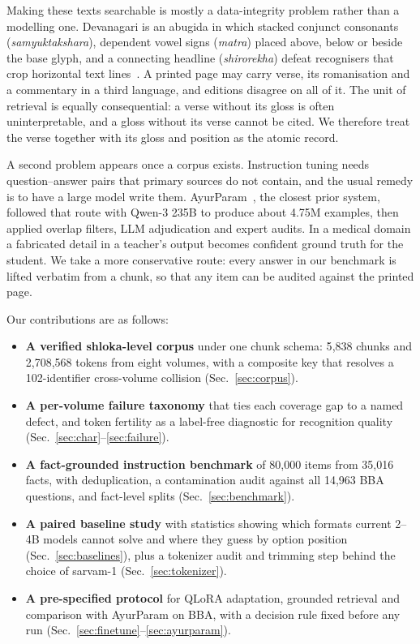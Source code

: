 \documentclass[10pt,twocolumn,letterpaper]{article}
\begin{document}
Making these texts searchable is mostly a data-integrity problem rather than a
modelling one. Devanagari is an abugida in which stacked conjunct consonants
(\emph{samyuktakshara}), dependent vowel signs (\emph{matra}) placed above, below
or beside the base glyph, and a connecting headline (\emph{shirorekha}) defeat
recognisers that crop horizontal text lines~\cite{devaocr,devavlm}. A printed page
may carry verse, its romanisation and a commentary in a third language, and editions
disagree on all of it. The unit of retrieval is equally consequential: a verse
without its gloss is often uninterpretable, and a gloss without its verse cannot
be cited. We therefore treat the verse together with its gloss and position as the
atomic record.

A second problem appears once a corpus exists. Instruction tuning needs
question--answer pairs that primary sources do not contain, and the usual remedy
is to have a large model write them. AyurParam~\cite{ayurparam}, the closest prior
system, followed that route with Qwen-3 235B to produce about 4.75M examples, then
applied overlap filters, LLM adjudication and expert audits. In a medical domain a
fabricated detail in a teacher's output becomes confident ground truth for the
student. We take a more conservative route: every answer in our benchmark is lifted
verbatim from a chunk, so that any item can be audited against the printed page.

Our contributions are as follows:
\begin{itemize}\itemsep1.5pt
\item \textbf{A verified shloka-level corpus} under one chunk schema: 5{,}838
chunks and 2{,}708{,}568 tokens from eight volumes, with a composite key that
resolves a 102-identifier cross-volume collision (Sec.~\ref{sec:corpus}).
\item \textbf{A per-volume failure taxonomy} that ties each coverage gap to a named
defect, and token fertility as a label-free diagnostic for recognition quality
(Sec.~\ref{sec:char}--\ref{sec:failure}).
\item \textbf{A fact-grounded instruction benchmark} of 80{,}000 items from 35{,}016
facts, with deduplication, a contamination audit against all 14{,}963 BBA
questions, and fact-level splits (Sec.~\ref{sec:benchmark}).
\item \textbf{A paired baseline study} with statistics showing which formats
current 2--4B models cannot solve and where they guess by option position
(Sec.~\ref{sec:baselines}), plus a tokenizer audit and trimming step behind the
choice of sarvam-1 (Sec.~\ref{sec:tokenizer}).
\item \textbf{A pre-specified protocol} for QLoRA adaptation, grounded retrieval
and comparison with AyurParam on BBA, with a decision rule fixed before any run
(Sec.~\ref{sec:finetune}--\ref{sec:ayurparam}).
\end{itemize}
\end{document}
